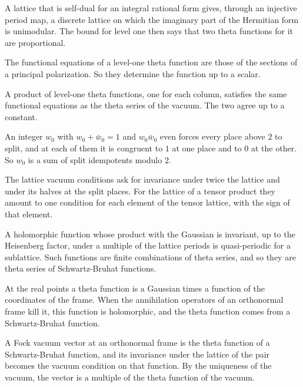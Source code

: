 A lattice that is self-dual for an integral rational form gives, through an injective period map, a discrete lattice
on which the imaginary part of the Hermitian form is unimodular. The bound for level one then says that two theta
functions for it are proportional.

The functional equations of a level-one theta function are those of the sections of a principal polarization. So
they determine the function up to a scalar.

A product of level-one theta functions, one for each column, satisfies the same functional equations as
the theta series of the vacuum. The two agree up to a constant.

An integer $w_0$ with $w_0+\bar w_0=1$ and $w_0\bar w_0$ even forces every place above $2$ to split, and at each of
them it is congruent to $1$ at one place and to $0$ at the other. So $w_0$ is a sum of split idempotents modulo $2$.

The lattice vacuum conditions ask for invariance under twice the lattice and under its halves at the split
places. For the lattice of a tensor product they amount to one condition for each element of the tensor
lattice, with the sign of that element.

A holomorphic function whose product with the Gaussian is invariant, up to the Heisenberg factor, under a multiple of
the lattice periods is quasi-periodic for a sublattice. Such functions are finite combinations of theta series, and
so they are theta series of Schwartz-Bruhat functions.

At the real points a theta function is a Gaussian times a function of the coordinates of the frame. When the
annihilation operators of an orthonormal frame kill it, this function is holomorphic, and the theta function
comes from a Schwartz-Bruhat function.

A Fock vacuum vector at an orthonormal frame is the theta function of a Schwartz-Bruhat function, and its
invariance under the lattice of the pair becomes the vacuum condition on that function. By the uniqueness of
the vacuum, the vector is a multiple of the theta function of the vacuum.

